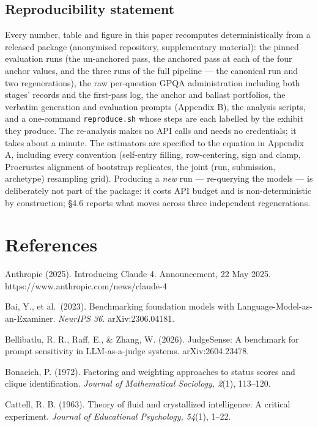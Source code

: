 \documentclass{article}
\begin{document}
\subsection*{Reproducibility statement}

Every number, table and figure in this paper recomputes deterministically from a released package (anonymised repository, supplementary material): the pinned evaluation runs (the un-anchored pass, the anchored pass at each of the four anchor values, and the three runs of the full pipeline --- the canonical run and two regenerations), the raw per-question GPQA administration including both stages' records and the first-pass log, the anchor and ballast portfolios, the verbatim generation and evaluation prompts (Appendix B), the analysis scripts, and a one-command \texttt{reproduce.sh} whose steps are each labelled by the exhibit they produce. The re-analysis makes no API calls and needs no credentials; it takes about a minute. The estimators are specified to the equation in Appendix A, including every convention (self-entry filling, row-centering, sign and clamp, Procrustes alignment of bootstrap replicates, the joint (run, submission, archetype) resampling grid). Producing a \emph{new} run --- re-querying the models --- is deliberately not part of the package: it costs API budget and is non-deterministic by construction; \S{}4.6 reports what moves across three independent regenerations.

\section*{References}
\begingroup\small\setlength{\parindent}{-1.5em}\setlength{\leftskip}{1.5em}

Anthropic (2025). Introducing Claude 4. Announcement, 22 May 2025. https://www.anthropic.com/news/claude-4

Bai, Y., et al.~(2023). Benchmarking foundation models with Language-Model-as-an-Examiner. \emph{NeurIPS 36.} arXiv:2306.04181.

Bellibatlu, R. R., Raff, E., \& Zhang, W. (2026). JudgeSense: A benchmark for prompt sensitivity in LLM-as-a-judge systems. arXiv:2604.23478.

Bonacich, P. (1972). Factoring and weighting approaches to status scores and clique identification. \emph{Journal of Mathematical Sociology, 2}(1), 113--120.

Cattell, R. B. (1963). Theory of fluid and crystallized intelligence: A critical experiment. \emph{Journal of Educational Psychology, 54}(1), 1--22.
\end{document}
